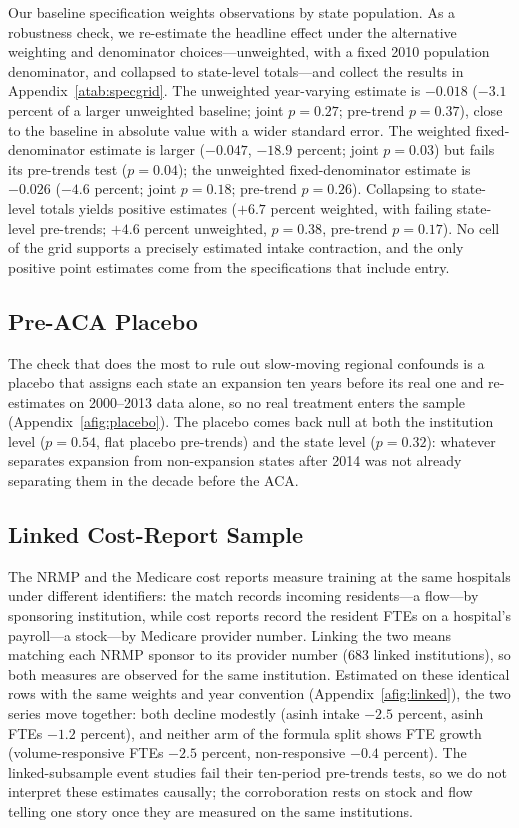 Our baseline specification weights observations by state population. As a robustness check, we re-estimate the headline effect under the alternative weighting and denominator choices---unweighted, with a fixed 2010 population denominator, and collapsed to state-level totals---and collect the results in Appendix~\cref{atab:specgrid}. The unweighted year-varying estimate is $-0.018$ ($-3.1$ percent of a larger unweighted baseline; joint $p = 0.27$; pre-trend $p = 0.37$), close to the baseline in absolute value with a wider standard error. The weighted fixed-denominator estimate is larger ($-0.047$, $-18.9$ percent; joint $p = 0.03$) but fails its pre-trends test ($p = 0.04$); the unweighted fixed-denominator estimate is $-0.026$ ($-4.6$ percent; joint $p = 0.18$; pre-trend $p = 0.26$). Collapsing to state-level totals yields positive estimates ($+6.7$ percent weighted, with failing state-level pre-trends; $+4.6$ percent unweighted, $p = 0.38$, pre-trend $p = 0.17$). No cell of the grid supports a precisely estimated intake contraction, and the only positive point estimates come from the specifications that include entry.

\subsection{Pre-ACA Placebo}\label{subsec:placebo}

The check that does the most to rule out slow-moving regional confounds is a placebo that assigns each state an expansion ten years before its real one and re-estimates on 2000--2013 data alone, so no real treatment enters the sample (Appendix~\cref{afig:placebo}). The placebo comes back null at both the institution level ($p = 0.54$, flat placebo pre-trends) and the state level ($p = 0.32$): whatever separates expansion from non-expansion states after 2014 was not already separating them in the decade before the ACA.

\subsection{Linked Cost-Report Sample}\label{subsec:linked}

The NRMP and the Medicare cost reports measure training at the same hospitals under different identifiers: the match records incoming residents---a flow---by sponsoring institution, while cost reports record the resident FTEs on a hospital's payroll---a stock---by Medicare provider number. Linking the two means matching each NRMP sponsor to its provider number ($683$ linked institutions), so both measures are observed for the same institution. Estimated on these identical rows with the same weights and year convention (Appendix~\cref{afig:linked}), the two series move together: both decline modestly (asinh intake $-2.5$ percent, asinh FTEs $-1.2$ percent), and neither arm of the formula split shows FTE growth (volume-responsive FTEs $-2.5$ percent, non-responsive $-0.4$ percent). The linked-subsample event studies fail their ten-period pre-trends tests, so we do not interpret these estimates causally; the corroboration rests on stock and flow telling one story once they are measured on the same institutions.


